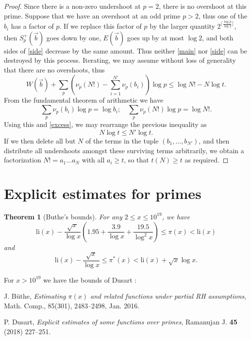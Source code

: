 \documentclass[12pt,a4paper,reqno]{amsart}
\numberwithin{equation}{section}
\theoremstyle{plain}
\newtheorem{theorem}{Theorem}[section]
\theoremstyle{definition}
\begin{document}
\begin{proof}  Since there is a non-zero undershoot at $p=2$, there is no overshoot at this prime. Suppose that we have an overshoot at an odd prime $p>2$, thus one of the $b_i$ has a factor of $p$. If we replace this factor of $p$ by the larger quantity $2^{\lceil \frac{\log p}{\log 2} \rceil}$, then $S^+_p(\vec b)$ goes down by one, $E(\vec b)$ goes up by at most $\log 2$, and both sides of \eqref{side} decrease by the same amount.  Thus neither \eqref{main} nor \eqref{side} can be destroyed by this process.  Iterating, we may assume without loss of generality that there are no overshoots, thus
 $$  W(\vec b) + \sum_p (\nu_p(N!) - \sum_{i=1}^{N'} \nu_p(b_i))\log p \leq \log N! - N \log t.$$
From the fundamental theorem of arithmetic we have
$$ \sum_p \nu_p(b_i) \log p = \log b_i; \quad \sum_p \nu_p(N!) \log p = \log N!.$$
Using this and \eqref{excess}, we may rearrange the previous inequality as
$$ N \log t \leq N' \log t.$$
If we then delete all but $N$ of the terms in the tuple $(b_1,\dots,b_{N'})$, and then distribute all undershoots amongst these surviving terms arbitrarily, we obtain a factorization $N! = a_1 \dots a_N$ with all $a_i \geq t$, so that $t(N) \geq t$ as required.
\end{proof}




\section{Explicit estimates for primes}

\begin{theorem}[Buthe's bounds]\cite{buthe}  For any $2 \leq x \leq 10^{19}$, we have
$$ \mathrm{li}(x) - \frac{\sqrt{x}}{\log x}(1.95 + \frac{3.9}{\log x} + \frac{19.5}{\log^2 x}) \leq \pi(x) < \mathrm{li}(x)$$
and
$$ \mathrm{li}(x) - \frac{\sqrt{x}}{\log x} \leq \pi^*(x) < \mathrm{li}(x) + \sqrt{x}{\log x}.$$
\end{theorem}

For $x > 10^{19}$ we have the bounds of Dusart \cite{dusart}:


\begin{thebibliography}{10}

J. B\"uthe, \emph{Estimating $\pi(x)$ and related functions under partial RH assumptions}, Math. Comp., 85(301), 2483--2498, Jan. 2016.

P. Dusart, \emph{Explicit estimates of some functions over primes}, Ramanujan J. \textbf{45} (2018) 227--251.


\end{thebibliography}
\end{document}

